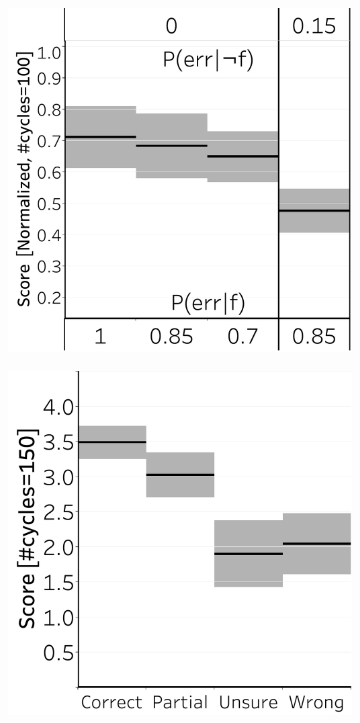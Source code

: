 \documentclass[letterpaper]{article} %
\newcommand{\?}{\mbox{?}}
\begin{document}
\begin{figure}[t]
\begin{subfigure}[b]{.47\columnwidth}
    \includegraphics[width=\columnwidth]{2b.pdf}
    \caption{}
    \label{fig:complexity_stochastic}
  \end{subfigure}
    \hfill
  \begin{subfigure}[b]{0.47\columnwidth}
  \centering
    \centering
    \includegraphics[width=\columnwidth]{wsl.pdf}

\end{subfigure}
\end{figure}
\end{document}
